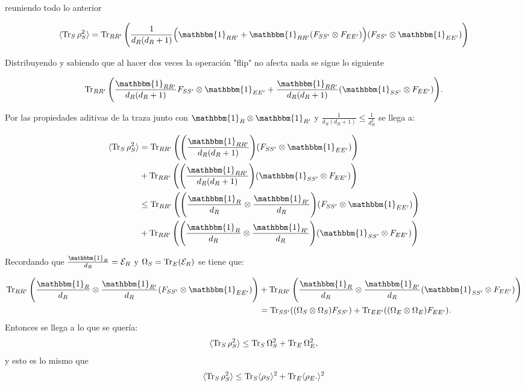 reuniendo todo lo anterior

\begin{equation}
\langle \Tr_{S} \rho_{S}^2 \rangle = \Tr_{RR'} \Bigg( \frac{1}{d_{R}(d_{R}+1)} \Big( \mathbbm{1}_{RR'}+\mathbbm{1}_{RR'}(F_{SS'} \otimes F_{EE'}) \Big)  (F_{SS'}\otimes \mathbbm{1}_{EE'})   \Bigg)
\end{equation}

Distribuyendo y sabiendo que al hacer dos veces la operación "flip" no afecta nada se sigue lo siguiente

\begin{equation}
\Tr_{RR'} \Bigg( \frac{\mathbbm{1}_{RR'}}{d_{R}(d_{R}+1)} F_{SS'} \otimes \mathbbm{1}_{EE'} + \frac{\mathbbm{1}_{RR'}}{d_{R}(d_{R}+1)} (\mathbbm{1}_{SS'} \otimes F_{EE'})  \Bigg).
\end{equation}

Por las propiedades aditivas de la traza junto con $\mathbbm{1}_{R} \otimes \mathbbm{1}_{R'}$  y $\frac{1}{d_{R}(d_{R}+1)} \le \frac{1}{d_{R}^{2}}$ se llega a:

\begin{align*}
\langle \Tr_{S} \rho_{S}^2 \rangle &= \Tr_{RR'} \Bigg( \Bigg( \frac{\mathbbm{1}_{RR'}}{d_{R}(d_{R}+1)} \Bigg) (F_{SS'} \otimes \mathbbm{1}_{EE'})  \Bigg) \\
\qquad  &+ \Tr_{RR'} \Bigg( \Bigg( \frac{\mathbbm{1}_{RR'}}{d_{R}(d_{R}+1)} \Bigg) (\mathbbm{1}_{SS'} \otimes F_{EE'} )  \Bigg)\\ 
&\leq \Tr_{RR'} \Bigg( \Bigg( \frac{\mathbbm{1}_{R}}{d_{R}} \otimes  \frac{\mathbbm{1}_{R'}}{d_{R}}  \Bigg) (F_{SS'} \otimes \mathbbm{1}_{EE'})  \Bigg)\\
\qquad &+ \Tr_{RR'} \Bigg( \Bigg( \frac{\mathbbm{1}_{R}}{d_{R}} \otimes  \frac{\mathbbm{1}_{R'}}{d_{R}}  \Bigg) (\mathbbm{1}_{SS'} \otimes F_{EE'} )  \Bigg)
\end{align*}
	
Recordando que $\frac{\mathbbm{1}_{R}}{d_{R}}= \mathcal{E}_{R}$ y $\Omega_{S}=\Tr_{E}(\mathcal{E}_{R})$ se tiene que:

\begin{align*}
\Tr_{RR'}\Bigg(\frac{\mathbbm{1}_{R}}{d_{R}} \otimes \frac{\mathbbm{1}_{R'}}{d_{R}} (F_{SS'} \otimes 		\mathbbm{1}_{EE'}) \Bigg) &+ \Tr_{RR'}\Bigg(\frac{\mathbbm{1}_{R}}{d_{R}} \otimes \frac{\mathbbm{1}_{R'}}{d_{R}} (\mathbbm{1}_{SS'}\otimes 	F_{EE'}) \Bigg) \notag \\
&= \Tr_{SS'}((\Omega_{S} \otimes \Omega_{S})F_{SS'}) + \Tr_{EE'}((\Omega_{E} \otimes \Omega_{E})F_{EE'}).
\end{align*}
Entonces se llega a lo que se quería:	
\begin{equation}
\langle \Tr_{S} \rho_{S}^{2} \rangle \le \Tr_{S} \Omega_{S}^{2} +\Tr_{E} \Omega_{E}^{2},
\end{equation}
y esto es lo mismo que 
\begin{equation}
\langle \Tr_{S} \rho_{S}^{2} \rangle \le \Tr_{S} \langle \rho_{S} \rangle ^{2}  + \Tr_{E} \langle \rho_{E}.\rangle^{2}
\end{equation}

